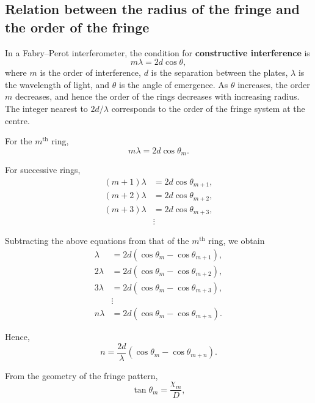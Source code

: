\subsection{Relation between the radius of the fringe and the order of the fringe}
In a Fabry--Perot interferometer, the condition for \textbf{constructive interference} is
\begin{equation}
m\lambda = 2d\cos\theta ,
\end{equation}
where $m$ is the order of interference, $d$ is the separation between the plates, $\lambda$ is the wavelength of light, and $\theta$ is the angle of emergence. As $\theta$ increases, the order $m$ decreases, and hence the order of the rings decreases with increasing radius. The integer nearest to $2d/\lambda$ corresponds to the order of the fringe system at the centre.

For the $m^{\text{th}}$ ring,
\begin{equation}
m\lambda = 2d\cos\theta_m .
\end{equation}

For successive rings,
\begin{align}
(m+1)\lambda &= 2d\cos\theta_{m+1}, \\
(m+2)\lambda &= 2d\cos\theta_{m+2}, \\
(m+3)\lambda &= 2d\cos\theta_{m+3}, \\
&\vdots
\end{align}

Subtracting the above equations from that of the $m^{\text{th}}$ ring, we obtain
\begin{align}
\lambda &= 2d\left( \cos\theta_m - \cos\theta_{m+1} \right), \\
2\lambda &= 2d\left( \cos\theta_m - \cos\theta_{m+2} \right), \\
3\lambda &= 2d\left( \cos\theta_m - \cos\theta_{m+3} \right), \\
&\vdots \\
n\lambda &= 2d\left( \cos\theta_m - \cos\theta_{m+n} \right).
\end{align}

Hence,
\begin{equation}
\label{eq:n_cos_diff}
n = \frac{2d}{\lambda}\left( \cos\theta_m - \cos\theta_{m+n} \right).
\end{equation}

From the geometry of the fringe pattern,
\begin{equation}
\tan\theta_m = \frac{\chi_m}{D},
\end{equation}

